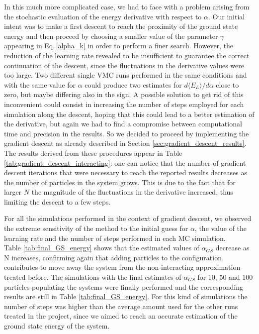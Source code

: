 In this much more complicated case, we had to face with a problem arising from the stochastic evaluation of the energy derivative with respect to $\alpha$. Our initial intent was to make a first descent to reach the proximity of the ground state energy and then proceed by choosing a smaller value of the parameter $\gamma$ appearing in Eq.\,\ref{alpha_k} in order to perform a finer search. However, the reduction of the learning rate revealed to be insufficient to guarantee the correct continuation of the descent, since the fluctuations in the derivative values were too large. Two different single VMC runs performed in the same conditions and with the same value for $\alpha$ could produce two estimates for $d\langle E_L \rangle / d\alpha$ close to zero, but maybe differing also in the sign. A possible solution to get rid of this inconvenient could consist in increasing the number of steps employed for each simulation along the descent, hoping that this could lead to a better estimation of the derivative, but again we had to find a compromise between computational time and precision in the results. So we decided to proceed by implementing the gradient descent as already described in Section \ref{sec:gradient_descent_results}. The results derived from these procedures appear in Table \ref{tab:gradient_descent_interacting}: one can notice that the number of gradient descent iterations that were necessary to reach the reported results decreases as the number of particles in the system grows. This is due to the fact that for larger $N$ the magnitude of the fluctuations in the derivative increased, thus limiting the descent to a few steps. 

For all the simulations performed in the context of gradient descent, we observed the extreme sensitivity of the method to the initial guess for $\alpha$, the value of the learning rate and the number of steps performed in each MC simulation. \\

Table \ref{tab:final_GS_energy} shows that the estimated values of $\alpha_{GS}$ decrease as N increases, confirming again that adding particles to the configuration contributes to move away the system from the non-interacting approximation treated before. The simulations with the final estimates of $\alpha_{GS}$ for 10, 50 and 100 particles populating the systems were finally performed and the corresponding results are still in Table \ref{tab:final_GS_energy}. For this kind of simulations the number of steps was higher than the average amount used for the other runs treated in the project, since we aimed to reach an accurate estimation of the ground state energy of the system.


